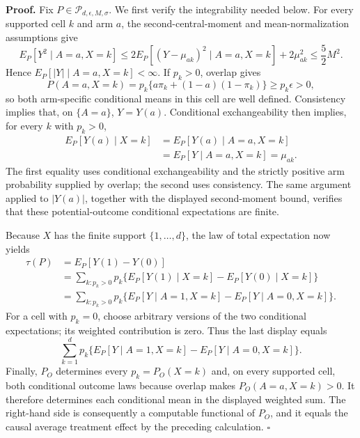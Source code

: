 \textbf{Proof.}
Fix \(P\in\mathcal P_{d,\epsilon,M,\sigma}\).  We first verify the integrability needed below.  For every supported cell \(k\) and arm \(a\), the second-central-moment and mean-normalization assumptions give
\[
 E_P[Y^2\mid A=a,X=k]
 \le 2E_P[(Y-\mu_{ak})^2\mid A=a,X=k]+2\mu_{ak}^2
 \le \frac52 M^2.
\]
Hence \(E_P[|Y|\mid A=a,X=k]<\infty\).  If \(p_k>0\), overlap gives
\[
 P(A=a,X=k)=p_k\{a\pi_k+(1-a)(1-\pi_k)\}\ge p_k\epsilon>0,
\]
so both arm-specific conditional means in this cell are well defined.  Consistency implies that, on \(\{A=a\}\), \(Y=Y(a)\).  Conditional exchangeability then implies, for every \(k\) with \(p_k>0\),
\[
 \begin{aligned}
 E_P[Y(a)\mid X=k]
 &=E_P[Y(a)\mid A=a,X=k] \\
 &=E_P[Y\mid A=a,X=k]
 =\mu_{ak}.
 \end{aligned}
\]
The first equality uses conditional exchangeability and the strictly positive arm probability supplied by overlap; the second uses consistency.  The same argument applied to \(|Y(a)|\), together with the displayed second-moment bound, verifies that these potential-outcome conditional expectations are finite.

Because \(X\) has the finite support \(\{1,\ldots,d\}\), the law of total expectation now yields
\[
 \begin{aligned}
 \tau(P)
 &=E_P[Y(1)-Y(0)] \\
 &=\sum_{k:p_k>0}p_k
 \bigl\{E_P[Y(1)\mid X=k]-E_P[Y(0)\mid X=k]\bigr\} \\
 &=\sum_{k:p_k>0}p_k
 \bigl\{E_P[Y\mid A=1,X=k]-E_P[Y\mid A=0,X=k]\bigr\}.
 \end{aligned}
\]
For a cell with \(p_k=0\), choose arbitrary versions of the two conditional expectations; its weighted contribution is zero.  Thus the last display equals
\[
 \sum_{k=1}^{d}p_k
 \bigl\{E_P[Y\mid A=1,X=k]-E_P[Y\mid A=0,X=k]\bigr\}.
\]
Finally, \(P_O\) determines every \(p_k=P_O(X=k)\) and, on every supported cell, both conditional outcome laws because overlap makes \(P_O(A=a,X=k)>0\).  It therefore determines each conditional mean in the displayed weighted sum.  The right-hand side is consequently a computable functional of \(P_O\), and it equals the causal average treatment effect by the preceding calculation. \(\square\)